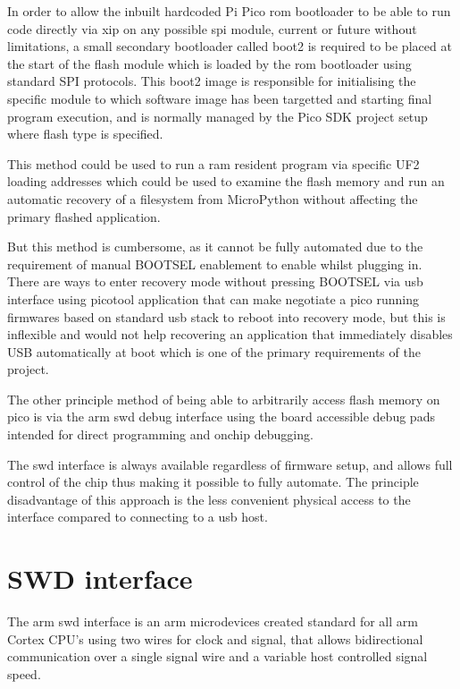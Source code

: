 In order to allow the inbuilt hardcoded Pi Pico \gls{rom} bootloader to be able to run code directly via \gls{xip} on any possible \gls{spi} module, current or future without limitations, a small secondary bootloader called boot2 is required to be placed at the start of the flash module which is loaded by the \gls{rom} bootloader using standard SPI protocols. This boot2 image is responsible for initialising the specific module to which software image has been targetted and starting final program execution, and is normally managed by the Pico SDK project setup where flash type is specified.


This method could be used to run a \gls{ram} resident program via specific UF2 loading addresses which could be used to examine the flash memory and run an automatic recovery of a filesystem from MicroPython without affecting the primary flashed application.

But this method is cumbersome, as it cannot be fully automated due to the requirement of manual BOOTSEL enablement to enable whilst plugging in. There are ways to enter recovery mode without pressing BOOTSEL via \gls{usb} interface using picotool application that can make negotiate a pico running firmwares based on standard \gls{usb} stack to reboot into recovery mode\cite{picotool}, but this is inflexible and would not help recovering an application that immediately disables USB automatically at boot which is one of the primary requirements of the project.

The other principle method of being able to arbitrarily access flash memory on pico is via the \gls{arm} \gls{swd} debug interface using the board accessible debug pads intended for direct programming and onchip debugging\cite{ARMDebugInterface}.

The \gls{swd} interface  is always available regardless of firmware setup, and allows full control of the chip thus making it possible to fully automate. The principle disadvantage of this approach is the less convenient physical access to the interface compared to connecting to a \gls{usb} host.
\clearpage
\section{SWD interface}
The \gls{arm} \gls{swd} interface is an \gls{arm} microdevices created standard for all \gls{arm} Cortex CPU's using two wires for clock and signal, that allows bidirectional communication over a single signal wire and a variable host controlled signal speed.

